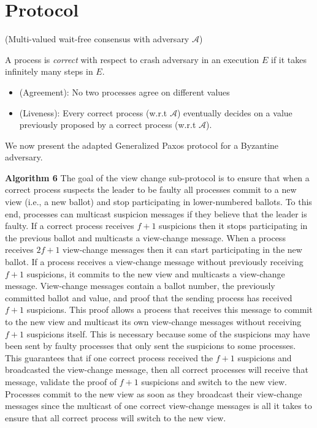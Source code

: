 \section{Protocol}
%
\begin{definition}
(Multi-valued wait-free consensus with adversary $\mathcal{A}$)

A process is \emph{correct} with respect to crash adversary 
in an execution $E$ if it takes infinitely many steps in $E$.
%
\begin{itemize}
\item (Agreement): No two processes agree on different values  
\item (Liveness): Every correct process (w.r.t $\mathcal{A}$) 
eventually decides on a value previously proposed by a correct process (w.r.t $\mathcal{A}$).
\end{itemize}
%
\end{definition}
%

%
\newpage
We now present the adapted Generalized Paxos protocol for a Byzantine adversary.\par
\textbf{Algorithm 6} The goal of the view change sub-protocol is to ensure that when a correct process suspects the leader to be faulty all processes commit to a new view (i.e., a new ballot) and stop participating in lower-numbered ballots. To this end, processes can multicast suspicion messages if they believe that the leader is faulty. If a correct process receives $f+1$ suspicions then it stops participating in the previous ballot and multicasts a view-change message. When a process receives $2f+1$ view-change messages then it can start participating in the new ballot. If a process receives a view-change message without previously receiving $f+1$ suspicions, it commits to the new view and multicasts a view-change message. View-change messages contain a ballot number, the previously committed ballot and value, and proof that the sending process has received $f+1$ suspicions. This proof allows a process that receives this message to commit to the new view and multicast its own view-change messages without receiving $f+1$ suspicions itself. This is necessary because some of the suspicions may have been sent by faulty processes that only sent the suspicions to some processes. This guarantees that if one correct process received the $f+1$ suspicions and broadcasted the view-change message, then all correct processes will receive that message, validate the proof of $f+1$ suspicions and switch to the new view. Processes commit to the new view as soon as they broadcast their view-change messages since the multicast of one correct view-change messages is all it takes to ensure that all correct process will switch to the new view.

